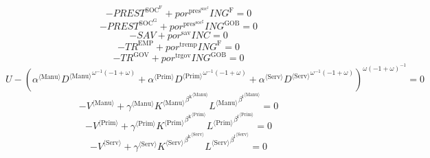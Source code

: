 \begin{equation}
-{P\!R\!E\!S\!T}^{\mathrm{SOC}^{\mathrm{F}}} + {{p\!o\!r}^{\mathrm{pres}^{\mathrm{soc}^{\mathrm{f}}}}} {{I\!N\!G}^{\mathrm{F}}} = 0
\end{equation}
\begin{equation}
-{P\!R\!E\!S\!T}^{\mathrm{SOC}^{\mathrm{G}}} + {{p\!o\!r}^{\mathrm{pres}^{\mathrm{soc}^{\mathrm{g}}}}} {{I\!N\!G}^{\mathrm{GOB}}} = 0
\end{equation}
\begin{equation}
-{S\!A\!V} + {{p\!o\!r}^{\mathrm{sav}}} {{I\!N\!C}} = 0
\end{equation}
\begin{equation}
-{T\!R}^{\mathrm{EMP}} + {{p\!o\!r}^{\mathrm{tremp}}} {{I\!N\!G}^{\mathrm{F}}} = 0
\end{equation}
\begin{equation}
-{T\!R}^{\mathrm{GOV}} + {{p\!o\!r}^{\mathrm{trgov}}} {{I\!N\!G}^{\mathrm{GOB}}} = 0
\end{equation}
\begin{equation}
U - \left({{\alpha}^{\langle \mathrm{\mathrm{Manu}}\rangle}} {{{D}^{\langle \mathrm{Manu}\rangle}}^{{\omega}^{-1} \left(-1 + \omega\right)}} + {{\alpha}^{\langle \mathrm{\mathrm{Prim}}\rangle}} {{{D}^{\langle \mathrm{Prim}\rangle}}^{{\omega}^{-1} \left(-1 + \omega\right)}} + {{\alpha}^{\langle \mathrm{\mathrm{Serv}}\rangle}} {{{D}^{\langle \mathrm{Serv}\rangle}}^{{\omega}^{-1} \left(-1 + \omega\right)}}\right)^{{\omega} \left(-1 + \omega\right)^{-1}} = 0
\end{equation}
\begin{equation}
-{V}^{\langle \mathrm{Manu}\rangle} + {{\gamma}^{\langle \mathrm{\mathrm{Manu}}\rangle}} {{{K}^{\langle \mathrm{Manu}\rangle}}^{{\beta^{\mathrm{k}}}^{\langle \mathrm{\mathrm{Manu}}\rangle}}} {{{L}^{\langle \mathrm{Manu}\rangle}}^{{\beta^{\mathrm{l}}}^{\langle \mathrm{\mathrm{Manu}}\rangle}}} = 0
\end{equation}
\begin{equation}
-{V}^{\langle \mathrm{Prim}\rangle} + {{\gamma}^{\langle \mathrm{\mathrm{Prim}}\rangle}} {{{K}^{\langle \mathrm{Prim}\rangle}}^{{\beta^{\mathrm{k}}}^{\langle \mathrm{\mathrm{Prim}}\rangle}}} {{{L}^{\langle \mathrm{Prim}\rangle}}^{{\beta^{\mathrm{l}}}^{\langle \mathrm{\mathrm{Prim}}\rangle}}} = 0
\end{equation}
\begin{equation}
-{V}^{\langle \mathrm{Serv}\rangle} + {{\gamma}^{\langle \mathrm{\mathrm{Serv}}\rangle}} {{{K}^{\langle \mathrm{Serv}\rangle}}^{{\beta^{\mathrm{k}}}^{\langle \mathrm{\mathrm{Serv}}\rangle}}} {{{L}^{\langle \mathrm{Serv}\rangle}}^{{\beta^{\mathrm{l}}}^{\langle \mathrm{\mathrm{Serv}}\rangle}}} = 0
\end{equation}
